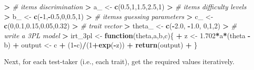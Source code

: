\documentclass[
]{article}
\newenvironment{Shaded}{\begin{snugshade}}{\end{snugshade}}
\newcommand{\CommentTok}[1]{\textcolor[rgb]{0.56,0.35,0.01}{\textit{#1}}}
\newcommand{\ControlFlowTok}[1]{\textcolor[rgb]{0.13,0.29,0.53}{\textbf{#1}}}
\newcommand{\DecValTok}[1]{\textcolor[rgb]{0.00,0.00,0.81}{#1}}
\newcommand{\ErrorTok}[1]{\textcolor[rgb]{0.64,0.00,0.00}{\textbf{#1}}}
\newcommand{\FloatTok}[1]{\textcolor[rgb]{0.00,0.00,0.81}{#1}}
\newcommand{\FunctionTok}[1]{\textcolor[rgb]{0.13,0.29,0.53}{\textbf{#1}}}
\newcommand{\NormalTok}[1]{#1}
\newcommand{\OtherTok}[1]{\textcolor[rgb]{0.56,0.35,0.01}{#1}}
\newcommand{\SpecialCharTok}[1]{\textcolor[rgb]{0.81,0.36,0.00}{\textbf{#1}}}
\begin{document}
\begin{Shaded}
\begin{Highlighting}[]
\SpecialCharTok{\textgreater{}} \CommentTok{\# items\textquotesingle{} discrimination}
\ErrorTok{\textgreater{}}\NormalTok{ a\_ }\OtherTok{\textless{}{-}} \FunctionTok{c}\NormalTok{(}\FloatTok{0.5}\NormalTok{,}\DecValTok{1}\NormalTok{,}\FloatTok{1.5}\NormalTok{,}\FloatTok{2.5}\NormalTok{,}\DecValTok{1}\NormalTok{)}
\SpecialCharTok{\textgreater{}} \CommentTok{\# items\textquotesingle{} difficulty levels}
\ErrorTok{\textgreater{}}\NormalTok{ b\_ }\OtherTok{\textless{}{-}} \FunctionTok{c}\NormalTok{(}\SpecialCharTok{{-}}\DecValTok{1}\NormalTok{,}\SpecialCharTok{{-}}\FloatTok{0.5}\NormalTok{,}\DecValTok{0}\NormalTok{,}\FloatTok{0.5}\NormalTok{,}\DecValTok{1}\NormalTok{)}
\SpecialCharTok{\textgreater{}} \CommentTok{\# items\textquotesingle{}s guessing parameters}
\ErrorTok{\textgreater{}}\NormalTok{ c\_ }\OtherTok{\textless{}{-}} \FunctionTok{c}\NormalTok{(}\DecValTok{0}\NormalTok{,}\FloatTok{0.1}\NormalTok{,}\FloatTok{0.15}\NormalTok{,}\FloatTok{0.05}\NormalTok{,}\FloatTok{0.32}\NormalTok{)}
\SpecialCharTok{\textgreater{}} \CommentTok{\# trait vector}
\ErrorTok{\textgreater{}}\NormalTok{ theta\_ }\OtherTok{\textless{}{-}} \FunctionTok{c}\NormalTok{(}\SpecialCharTok{{-}}\FloatTok{2.0}\NormalTok{, }\SpecialCharTok{{-}}\FloatTok{1.0}\NormalTok{, }\DecValTok{0}\NormalTok{,}\DecValTok{1}\NormalTok{,}\DecValTok{2}\NormalTok{)}
\SpecialCharTok{\textgreater{}} \CommentTok{\# write a 3PL model}
\ErrorTok{\textgreater{}}\NormalTok{ irt\_3pl }\OtherTok{\textless{}{-}} \ControlFlowTok{function}\NormalTok{(theta,a,b,c)\{}
\SpecialCharTok{+}\NormalTok{   z }\OtherTok{\textless{}{-}} \FloatTok{1.702}\SpecialCharTok{*}\NormalTok{a}\SpecialCharTok{*}\NormalTok{(theta }\SpecialCharTok{{-}}\NormalTok{ b)}
\SpecialCharTok{+}\NormalTok{   output }\OtherTok{\textless{}{-}}\NormalTok{ c }\SpecialCharTok{+}\NormalTok{ (}\DecValTok{1}\SpecialCharTok{{-}}\NormalTok{c)}\SpecialCharTok{/}\NormalTok{(}\DecValTok{1}\SpecialCharTok{+}\FunctionTok{exp}\NormalTok{(}\SpecialCharTok{{-}}\NormalTok{z))}
\SpecialCharTok{+}   \FunctionTok{return}\NormalTok{(output)}
\SpecialCharTok{+}\NormalTok{ \}}
\end{Highlighting}
\end{Shaded}

Next, for each test-taker (i.e., each trait), get the required values
iteratively.
\end{document}
